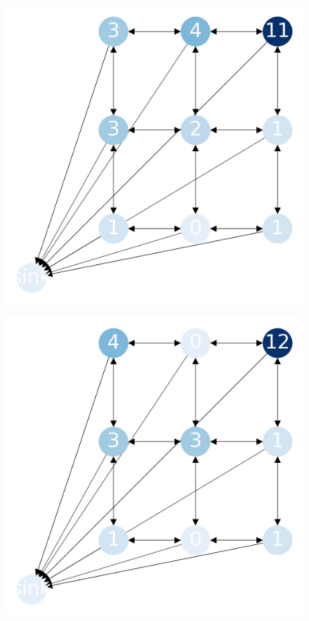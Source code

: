 \documentclass{beamer}
\begin{document}
\begin{frame}
  \begin{figure}[h!]
    \centering
      \includegraphics[scale=0.25]{sandpile_24}
  \end{figure}
\end{frame}


\begin{frame}
  \begin{figure}[h!]
    \centering
      \includegraphics[scale=0.25]{sandpile_25}
  \end{figure}
\end{frame}
\end{document}
